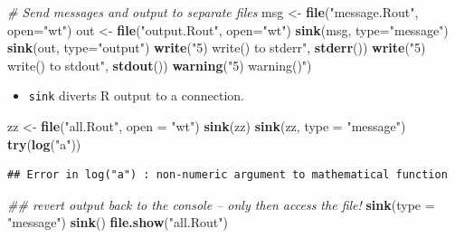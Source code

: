 \documentclass[]{book}
\newenvironment{Shaded}{\begin{snugshade}}{\end{snugshade}}
\newcommand{\CommentTok}[1]{\textcolor[rgb]{0.56,0.35,0.01}{\textit{#1}}}
\newcommand{\DataTypeTok}[1]{\textcolor[rgb]{0.13,0.29,0.53}{#1}}
\newcommand{\KeywordTok}[1]{\textcolor[rgb]{0.13,0.29,0.53}{\textbf{#1}}}
\newcommand{\NormalTok}[1]{#1}
\newcommand{\StringTok}[1]{\textcolor[rgb]{0.31,0.60,0.02}{#1}}
\providecommand{\tightlist}{%
  \setlength{\itemsep}{0pt}\setlength{\parskip}{0pt}}
\begin{document}
\begin{Shaded}
\begin{Highlighting}[]
\CommentTok{# Send messages and output to separate files}
\NormalTok{msg <-}\StringTok{ }\KeywordTok{file}\NormalTok{(}\StringTok{"message.Rout"}\NormalTok{, }\DataTypeTok{open=}\StringTok{"wt"}\NormalTok{)}
\NormalTok{out <-}\StringTok{ }\KeywordTok{file}\NormalTok{(}\StringTok{"output.Rout"}\NormalTok{, }\DataTypeTok{open=}\StringTok{"wt"}\NormalTok{)}
\KeywordTok{sink}\NormalTok{(msg, }\DataTypeTok{type=}\StringTok{"message"}\NormalTok{)}
\KeywordTok{sink}\NormalTok{(out, }\DataTypeTok{type=}\StringTok{"output"}\NormalTok{)}
\KeywordTok{write}\NormalTok{(}\StringTok{"5) write() to stderr"}\NormalTok{, }\KeywordTok{stderr}\NormalTok{())}
\KeywordTok{write}\NormalTok{(}\StringTok{"5) write() to stdout"}\NormalTok{, }\KeywordTok{stdout}\NormalTok{())}
\KeywordTok{warning}\NormalTok{(}\StringTok{"5) warning()"}\NormalTok{)}
\end{Highlighting}
\end{Shaded}

\begin{itemize}
\tightlist
\item
  \texttt{sink} diverts R output to a connection.
\end{itemize}

\begin{Shaded}
\begin{Highlighting}[]
\NormalTok{zz <-}\StringTok{ }\KeywordTok{file}\NormalTok{(}\StringTok{"all.Rout"}\NormalTok{, }\DataTypeTok{open =} \StringTok{"wt"}\NormalTok{)}
\KeywordTok{sink}\NormalTok{(zz)}
\KeywordTok{sink}\NormalTok{(zz, }\DataTypeTok{type =} \StringTok{"message"}\NormalTok{)}
\KeywordTok{try}\NormalTok{(}\KeywordTok{log}\NormalTok{(}\StringTok{"a"}\NormalTok{))}
\end{Highlighting}
\end{Shaded}

\begin{verbatim}
## Error in log("a") : non-numeric argument to mathematical function
\end{verbatim}

\begin{Shaded}
\begin{Highlighting}[]
\CommentTok{## revert output back to the console -- only then access the file!}
\KeywordTok{sink}\NormalTok{(}\DataTypeTok{type =} \StringTok{"message"}\NormalTok{)}
\KeywordTok{sink}\NormalTok{()}
\KeywordTok{file.show}\NormalTok{(}\StringTok{"all.Rout"}\NormalTok{)}
\end{Highlighting}
\end{Shaded}
\end{document}
